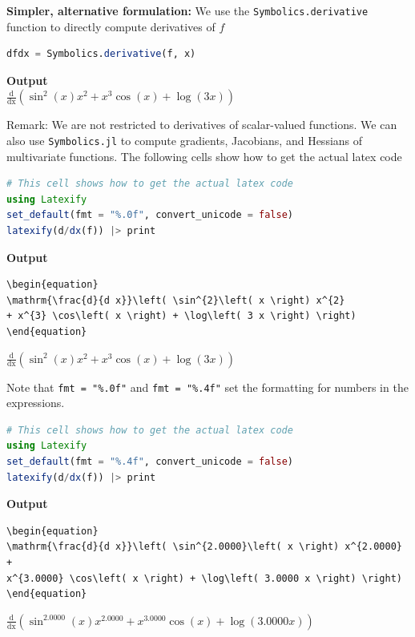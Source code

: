 \textbf{Simpler, alternative formulation:} We use the \texttt{Symbolics.derivative} function to directly compute derivatives of $f$

\begin{lstlisting}[language=Julia,style=mystyle]
dfdx = Symbolics.derivative(f, x)
\end{lstlisting}
\textbf{Output} \\
$\mathrm{\frac{d}{d x}}\left( \sin^{2}\left( x \right) x^{2} + x^{3} \cos\left( x \right) + \log\left( 3 x \right) \right)$

\begin{tcolorbox}
    Remark: We are not restricted to derivatives of scalar-valued functions. We can also use \texttt{Symbolics.jl} to compute gradients, Jacobians, and Hessians of multivariate functions. The following cells show how to get the actual latex code

    \begin{lstlisting}[language=Julia,style=mystyle]
# This cell shows how to get the actual latex code
using Latexify
set_default(fmt = "%.0f", convert_unicode = false)
latexify(d/dx(f)) |> print
\end{lstlisting}
\textbf{Output} 
\begin{verbatim}
\begin{equation}
\mathrm{\frac{d}{d x}}\left( \sin^{2}\left( x \right) x^{2} 
+ x^{3} \cos\left( x \right) + \log\left( 3 x \right) \right)
\end{equation}
\end{verbatim}
$\mathrm{\frac{d}{d x}}\left( \sin^{2}\left( x \right) x^{2} 
+ x^{3} \cos\left( x \right) + \log\left( 3 x \right) \right)$

Note that \texttt{fmt = "\%.0f"} and \texttt{fmt = "\%.4f"} set the formatting for numbers in the expressions.
\begin{lstlisting}[language=Julia,style=mystyle]
# This cell shows how to get the actual latex code
using Latexify
set_default(fmt = "%.4f", convert_unicode = false)
latexify(d/dx(f)) |> print
\end{lstlisting}
\textbf{Output} 
\begin{verbatim}
\begin{equation}
\mathrm{\frac{d}{d x}}\left( \sin^{2.0000}\left( x \right) x^{2.0000} + 
x^{3.0000} \cos\left( x \right) + \log\left( 3.0000 x \right) \right)
\end{equation}
\end{verbatim}
$\mathrm{\frac{d}{d x}}\left( \sin^{2.0000}\left( x \right) x^{2.0000} + x^{3.0000} \cos\left( x \right) + \log\left( 3.0000 x \right) \right)
$

\end{tcolorbox}

